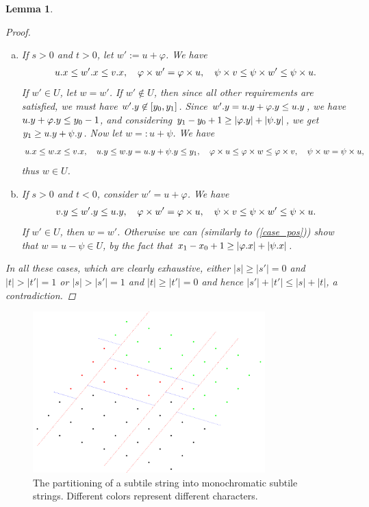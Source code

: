 \documentclass[11pt, letterpaper]{article}
\theoremstyle{plain}
\newtheorem{lemma}{Lemma}
\theoremstyle{definition}
\theoremstyle{remark}
\renewcommand{\phi}{\varphi}
\newcommand{\eq}[1]{\begin{align*} #1 \end{align*}}
\begin{document}
\begin{lemma}
\begin{proof}
\begin{enumerate}[(a)]
			\item If $s > 0$ and $t > 0$, let $w' := u + \phi$. \label{case_pos}
				We have \eq{
					\x{u} \le \x{w'} \le \x{v}, \quad \h{w'} = \h{u}, \quad \s{v} \le \s{w'} \le \s{u}.
				}
				If $w' \in U$, let $w = w'$.
				If $w' \not \in U$, then since all other requirements are satisfied, we must have $w'.y \not \in [y_0, y_1]$.
				Since $\y{w'} = \y{u} + \y{\phi} \le \y{u}$, we have $\y{u} + \y{\phi} \le y_0 - 1$, and
				considering $y_1 - y_0 + 1 \ge |\y{\phi}| + |\y{\psi}|$, we get $y_1 \ge u.y + \psi.y$.
				Now let $w =: u + \psi$.
				We have \eq{
					\x{u} \le \x{w} \le \x{v}, \quad \y{u} \le \y{w} = \y{u} + \y{\psi} \le y_1, \quad \h{u} \le \h{w} \le \h{v}, \quad \s{w} = \s{u},
				}
				thus $w \in U$.
			\item If $s > 0$ and $t < 0$, consider $w' = u + \phi$.
				We have \eq{
					\y{v} \le \y{w'} \le \y{u}, \quad \h{w'} = \h{u}, \quad \s{v} \le \s{w'} \le \s{u}.
				}
				If $w' \in U$, then $w = w'$.
				Otherwise we can (similarly to (\ref{case_pos})) show that $w = u - \psi \in U$, by the fact that $x_1 - x_0 + 1 \ge |\x{\phi}| + |\x{\psi}|$. 
		\end{enumerate}
		In all these cases, which are clearly exhaustive, either $|s| \ge |s'| = 0$ and $|t| > |t'| = 1$ or $|s| > |s'| = 1$ and $|t| \ge |t'| = 0$ and hence $|s'|+|t'| \le |s|+|t|$, a contradiction. 
	\end{proof}
\end{lemma}


\begin{figure}[!t]
	\begin{center}
		\includegraphics[width=0.8\textwidth]{drawings/parquet_decomposition}
	\end{center}
	\caption{The partitioning of a subtile string into monochromatic subtile strings. Different colors represent different characters.}
	\label{figure:tile_decomposition}
\end{figure}
\end{document}
